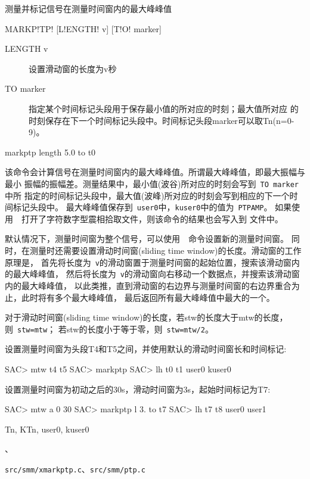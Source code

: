 \label{cmd:markptp}

测量并标记信号在测量时间窗内的最大峰峰值

\begin{SACSTX}
MARKP!TP! [L!ENGTH! v] [T!O! marker]
\end{SACSTX}

\begin{description}
\item [LENGTH v] 设置滑动窗的长度为v秒
\item [TO marker] 指定某个时间标记头段用于保存最小值的所对应的时刻；最大值所对应
    的时刻保存在下一个时间标记头段中。时间标记头段marker可以取Tn(n=0-9)。
\end{description}

\begin{SACDFT}
markptp length 5.0 to t0
\end{SACDFT}

该命令会计算信号在测量时间窗内的最大峰峰值。所谓最大峰峰值，即最大振幅与最小
振幅的振幅差。测量结果中，最小值(波谷)所对应的时刻会写到~\verb+TO marker+中所
指定的时间标记头段中，最大值(波峰)所对应的时刻会写到相应的下一个时间标记头段中。
最大峰峰值保存到~\verb+user0+中，\verb+kuser0+中的值为~\verb+PTPAMP+。
如果使用~~打开了字符数字型震相拾取文件，则该命令的结果也会写入到
文件中。

默认情况下，测量时间窗为整个信号，可以使用~~命令设置新的测量时间窗。
同时，在测量时还需要设置滑动时间窗(sliding time window)的长度。滑动窗的工作原理是，
首先将长度为~\verb+v+的滑动窗置于测量时间窗的起始位置，搜索该滑动窗内的最大峰峰值，
然后将长度为~\verb+v+的滑动窗向右移动一个数据点，并搜索该滑动窗内的最大峰峰值，
以此类推，直到滑动窗的右边界与测量时间窗的右边界重合为止，此时将有多个最大峰峰值，
最后返回所有最大峰峰值中最大的一个。

对于滑动时间窗(sliding time window)的长度，若stw的长度大于mtw的长度，则~\verb+stw=mtw+；
若stw的长度小于等于零，则~\verb+stw=mtw/2+。

设置测量时间窗为头段T4和T5之间，并使用默认的滑动时间窗长和时间标记:
\begin{SACCode}
SAC> mtw t4 t5
SAC> markptp
SAC> lh t0 t1 user0 kuser0
\end{SACCode}

设置测量时间窗为初动之后的30s，滑动时间窗为3s，起始时间标记为T7:
\begin{SACCode}
SAC> mtw a 0 30
SAC> markptp l 3. to t7
SAC> lh t7 t8 user0 user1
\end{SACCode}

Tn, KTn, user0, kuser0

、

\verb+src/smm/xmarkptp.c+、\verb+src/smm/ptp.c+
